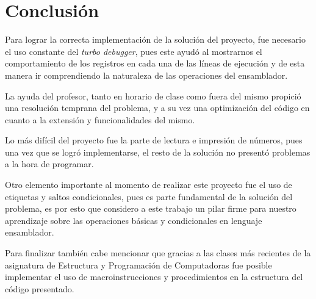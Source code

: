\documentclass[letter,12 pt,titlepage]{article}
\begin{document}
    \section{Conclusión}

    Para lograr la correcta implementación de la solución del proyecto, fue necesario el uso constante del \textit{turbo debugger}, pues este ayudó al mostrarnos el comportamiento de los registros en cada una de las líneas de ejecución y de esta manera ir comprendiendo la naturaleza de las operaciones del ensamblador.

    La ayuda del profesor, tanto en horario de clase como fuera del mismo propició una resolución temprana del problema, y a su vez una optimización del código en cuanto a la extensión y funcionalidades del mismo.

    Lo más difícil del proyecto fue la parte de lectura e impresión de números, pues una vez que se logró implementarse, el resto de la solución no presentó problemas a la hora de programar.

    Otro elemento importante al momento de realizar este proyecto fue el uso de etiquetas y saltos condicionales, pues es parte fundamental de la solución del problema, es por esto que considero a este trabajo un pilar firme para nuestro aprendizaje sobre las operaciones básicas y condicionales en lenguaje ensamblador.

    Para finalizar también cabe mencionar que gracias a las clases más recientes de la asignatura de Estructura y Programación de Computadoras fue posible implementar el uso de macroinstrucciones y procedimientos en la estructura del código presentado.
\end{document}
